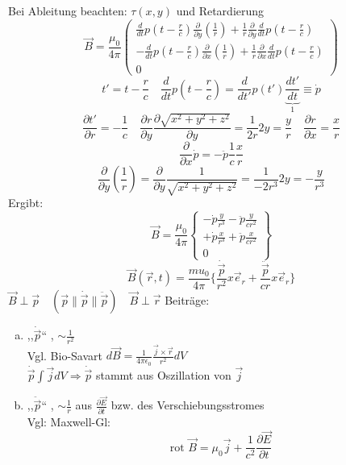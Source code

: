 \documentclass[titlepage,12pt,a4paper,ngerman]{report}
\newcommand{\tx}[1]{\textrm{#1}}
\newcommand{\ub}[1]{\underbrace{#1}}
\begin{document}
Bei Ableitung beachten: $ \tau(x,y) $ und Retardierung 
$$\vec{B}  = \frac{\mu_0}{4 \pi} \begin{pmatrix}
\frac{d}{dt} p(t-\frac{r}{c}) \frac{\partial}{\partial y} (\frac{1}{r}) + \frac{1}{r} \frac{\partial }{\partial y} \frac{d}{dt} p(t-\frac{r}{c}) \\
-\frac{d}{dt} p(t-\frac{r}{c}) \frac{\partial}{\partial x} (\frac{1}{r}) + \frac{1}{r} \frac{\partial }{\partial x} \frac{d}{dt} p(t-\frac{r}{c}) \\
0
\end{pmatrix}$$
$$t' = t-\frac{r}{c} \quad \frac{d}{dt} p(t-\frac{r}{c}) = \frac{d}{dt'} p(t') \ub{\frac{dt'}{dt}}_{1} \equiv \dot{p}$$
$$\frac{\partial t'}{\partial r} = -\frac{1}{c} \quad \frac{\partial r}{\partial y} \frac{\partial \sqrt{x^2 + y^2 + z^2}}{\partial y} = \frac{1}{2r} 2y = \frac{y}{r} \quad \frac{\partial r}{\partial x} = \frac{x}{r}$$
$$\frac{\partial }{\partial x} \dot{p} = - \ddot{p} \frac{1}{c} \frac{x}{r}$$
$$\frac{\partial }{\partial y} (\frac{1}{r}) = \frac{\partial }{\partial y} \frac{1}{\sqrt{x^2 + y^2 + z^2}} = \frac{1}{-2r^3} 2y = - \frac{y}{r^3} $$
Ergibt:
$$\vec{B} = \frac{\mu_0}{4 \pi} \begin{Bmatrix}
-\dot{p} \frac{y}{r^3} - \ddot{p} \frac{y}{cr^2} \\
+ \dot{p} \frac{x}{r^3} + \ddot{p} \frac{x}{cr^2} \\
0
\end{Bmatrix}$$
$$\vec{B}(\vec{r},t) = \frac{mu_0}{4 \pi} \bigg\{ \frac{\dot{\vec{p}}}{r^2} x \vec{e}_r + \frac{\ddot{\vec{p}}}{c r} x \vec{e}_r \bigg\}$$
$ \vec{B} \perp \vec{p} \quad (\vec{p} \parallel \dot{\vec{p}} \parallel \ddot{\vec{p}} ) \quad \vec{B} \perp \vec{r} $ 
Beiträge:
\begin{enumerate}[a)]
	\item ,,$ \dot{\vec{p}} $`` , $ \sim \frac{1}{r^2} $\\
	Vgl. Bio-Savart $ d\vec{B} = \frac{1}{4 \pi \epsilon_0} \frac{\vec{j} \times \vec{r}}{r^2} dV $\\
	$ \dot{\vec{p}} \int\vec{j} dV \Rightarrow \dot{\vec{p}} $ stammt aus Oszillation von $ \vec{j} $
	\item ,,$ \ddot{\vec{p}} $`` , $ \sim \frac{1}{r} $ aus $ \frac{\partial \vec{E}}{\partial t} $ bzw. des Verschiebungsstromes \\
	Vgl: Maxwell-Gl:
	$$\tx{rot } \vec{B} = \mu_0 \vec{j}  + \frac{1}{c^2}  \frac{\partial \vec{E}}{\partial t}$$
\end{enumerate}
\end{document}
